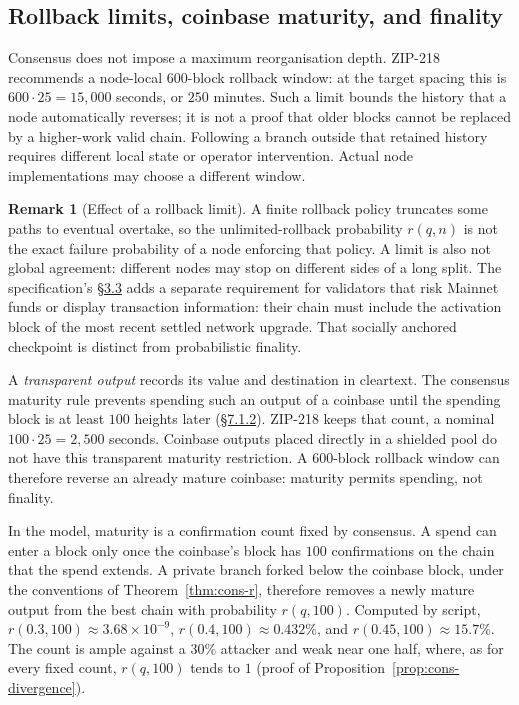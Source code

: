 \documentclass[11pt,a4paper]{article}
\theoremstyle{definition}
\newtheorem{remark}[theorem]{Remark}
\begin{document}
\subsection{Rollback limits, coinbase maturity, and finality}\label{sec:cons-rails}

Consensus does not impose a maximum reorganisation depth. ZIP-218
recommends a node-local $600$-block rollback window: at the target spacing
this is $600\cdot25=15{,}000$ seconds, or $250$ minutes. Such a limit bounds
the history that a node automatically reverses; it is not a proof that
older blocks cannot be replaced by a higher-work valid chain. Following
a branch outside that retained history requires different local state or
operator intervention. Actual node implementations may choose a different
window.

\begin{remark}[Effect of a rollback limit]\label{rem:cons-railsregister}
A finite rollback policy truncates some paths to eventual overtake,
so the unlimited-rollback probability $r(q,n)$ is not the exact failure
probability of a node enforcing that policy. A limit is also not global
agreement: different nodes may stop on different sides of a long split.
The specification's
\href{https://zips.z.cash/protocol/protocol.pdf\#blockchain}{\S3.3}
adds a separate requirement for validators that risk Mainnet funds or
display transaction information: their chain must include the activation
block of the most recent settled network upgrade. That socially anchored
checkpoint is distinct from probabilistic finality.
\end{remark}

A \emph{transparent output} records its value and destination in cleartext.
The consensus maturity rule prevents spending such an output of a coinbase
until the spending block is at least $100$ heights later
(\href{https://zips.z.cash/protocol/protocol.pdf\#txnconsensus}{\S7.1.2}).
ZIP-218 keeps that count, a nominal $100\cdot25=2{,}500$ seconds. Coinbase
outputs placed directly in a shielded pool do not have this transparent
maturity restriction. A $600$-block rollback window can therefore reverse
an already mature coinbase: maturity permits spending, not finality.

In the model, maturity is a confirmation count fixed by consensus. A spend
can enter a block only once the coinbase's block has $100$ confirmations on
the chain that the spend extends. A private branch forked below the coinbase
block, under the conventions of Theorem~\ref{thm:cons-r}, therefore removes
a newly mature output from the best chain with probability $r(q,100)$.
Computed by script, $r(0.3,100)\approx3.68\times10^{-9}$,
$r(0.4,100)\approx0.432\%$, and $r(0.45,100)\approx15.7\%$. The count is
ample against a $30\%$ attacker and weak near one half, where, as for every
fixed count, $r(q,100)$ tends to $1$ (proof of
Proposition~\ref{prop:cons-divergence}).
\end{document}
